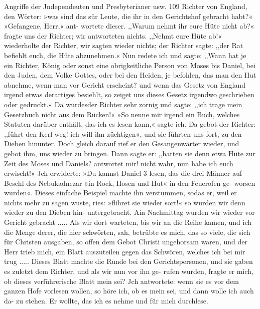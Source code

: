 Angriffe der Jndependeuten und Presbyterianer usw. 109
Richter von England, den Wörter: »was sind das sür Leute, die
ihr in den Gerichtshof gebracht habt?« »Gefangene, Herr,« ant-
wortete dieser. ,,Warum nehmt ihr eure Hüte nicht ab?« fragte
uns der Richter; wir antworteten nichts. ,,Nehmt eure Hüte
ab!« wiederholte der Richter, wir sagten wieder nichts; der
Richter sagte: ,,der Rat befiehlt euch, die Hüte abzunehmen.«
Nun redete ich und sagte: ,,Wann hat je ein Richter, König oder
sonst eine obrigkeitliche Person von Moses bis Daniel, bei den
Juden, dem Volke Gottes, oder bei den Heiden, je befohlen, das
man den Hut abnehme, wenn man vor Gericht erscheint? und
wenn das Gesetz von England irgend etwas derartiges besiehlt,
so zeiget uns dieses Gesetz irgendwo geschrieben oder gedruckt.«
Da wurdesder Richter sehr zornig und sagte: ,,ich trage mein
Gesetzbuch nicht aus dem Rücken!« »So nenne mir irgend ein
Buch, welches Statuten darüber enthält, das ich es lesen kann,«
sagte ich. Da gebot der Richter: ,,führt den Kerl weg! ich will
ihn züchtigen«, und sie führten uns fort, zu den Dieben hinunter.
Doch gleich darauf rief er den Gesangenwärter wieder, und
gebot ihm, uns wieder zu bringen. Dann sagte er: ,,hatten sie
denn etwa Hüte zur Zeit des Moses und Daniels? antwortet
mir! nicht wahr, nun habe ich euch erwischt!« Jch erwiderte:
»Du kannst Daniel 3 lesen, das die drei Männer auf Besehl des
Nebukadnezar »in Rock, Hosen und Hut« in den Feuerofen ge-
worsen wurden«. Dieses einfache Beispiel machte ihn verstummen,
sodas er, weil er nichts mehr zu sagen wuste, ries: »flihret sie
wieder sort!« so wurden wir denn wieder zu den Dieben hin-
untergebracht. Ain Nachmittag wurden wir wieder vor Gericht
gebracht ..... Als wir dort warteten, bis wir an die Reihe
kamen, und ich die Menge derer, die hier schwörten, sah, betrübte
es mich, das so viele, die sich für Christen ausgaben, so offen
dem Gebot Christi ungehorsam waren, und der Herr trieb mich,
ein Blatt auszuteilen gegen das Schwören, welches ich bei mir
trug .....
Dieses Blatt machte die Runde bei den Gerichtspersonen, und
sie gaben es zuletzt dem Richter, und als wir nun vor ihn ge-
rufen wurden, fragte er mich, ob dieses verführerische Blatt mein
sei? Jch antwortete: wenn sie es vor dem ganzen Hofe vorlesen
wollen, so höre ich, ob es mein sei, und dann wolle ich auch da-
zu stehen. Er wollte, das ich es nehme und für mich durchlese.

